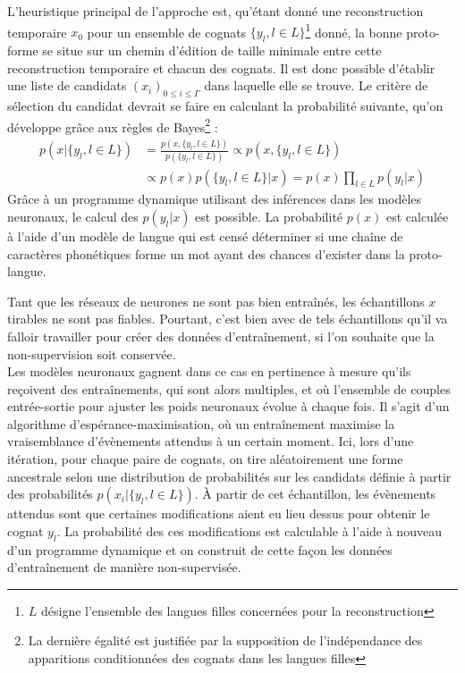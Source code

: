 \documentclass[12pt, french, twoside]{report}
\begin{document}
L'heuristique principal de l'approche est, qu'étant donné une reconstruction temporaire $x_0$ pour un ensemble de cognats $\{y_l, l\in L \}$\footnote{$L$ désigne l'ensemble des langues filles concernées pour la reconstruction} donné, la bonne proto-forme se situe sur un chemin d'édition de taille minimale entre cette reconstruction temporaire et chacun des cognats. Il est donc possible d'établir une liste de candidats $(x_i)_{0\leq{}i\leq{}\Gamma}$ dans laquelle elle se trouve. Le critère de sélection du candidat devrait se faire en calculant la probabilité suivante, qu'on développe grâce aux règles de Bayes\footnote{La dernière égalité est justifiée par la supposition de l'indépendance des apparitions conditionnées des cognats dans les langues filles} :
\begin{equation} \label{probaSampling}
    \begin{split}
        p(x|\{y_l, l \in L\}) & = \frac{p(x, \{y_l, l \in L\})}{p(\{y_l, l \in L\})} \propto p(x, \{y_l, l \in L\})\\
        & \propto p(x)p(\{y_l, l \in L\}|x) = p(x)\prod_{l\in L} p(y_l|x)
    \end{split}
\end{equation}
Grâce à un programme dynamique utilisant des inférences dans les modèles neuronaux, le calcul des $p(y_l|x)$ est possible. La probabilité $p(x)$ est calculée à l'aide d'un modèle de langue qui est censé déterminer si une chaîne de caractères phonétiques forme un mot ayant des chances d'exister dans la proto-langue.\cite[5]{he2022neural}

Tant que les réseaux de neurones ne sont pas bien entraînés, les échantillons $x$ tirables ne sont pas fiables. Pourtant, c'est bien avec de tels échantillons qu'il va falloir travailler pour créer des données d'entraînement, si l'on souhaite que la non-supervision soit conservée.\\
Les modèles neuronaux gagnent dans ce cas en pertinence à mesure qu'ils reçoivent des entraînements, qui sont alors multiples, et où l'ensemble de couples entrée-sortie pour ajuster les poids neuronaux évolue à chaque fois. Il s'agit d'un algorithme d'espérance-maximisation\cite{EM}, où un entraînement maximise la vraisemblance d'évènements attendus à un certain moment. Ici, lors d'une itération, pour chaque paire de cognats, on tire aléatoirement une forme ancestrale selon une distribution de probabilités sur les candidats définie à partir des probabilités $p(x_i|\{y_l, l \in L\})$. À partir de cet échantillon, les évènements attendus sont que certaines modifications aient eu lieu dessus pour obtenir le cognat $y_l$. La probabilité des ces modifications est calculable à l'aide à nouveau d'un programme dynamique et on construit de cette façon les données d'entraînement de manière non-supervisée.\cite[6]{he2022neural}
\end{document}
